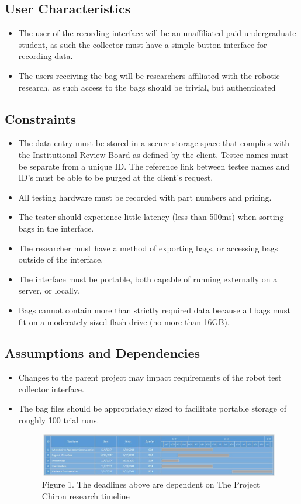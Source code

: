 \documentclass[onecolumn, draftclsnofoot,10pt, compsoc]{IEEEtran}
\begin{document}
\subsection{User Characteristics}
\begin{itemize}
	\item The user of the recording interface will be an unaffiliated paid undergraduate student, as such the collector must have a simple button interface for recording data.
	\item The users receiving the bag will be researchers affiliated with the robotic research, as such access to the bags should be trivial, but authenticated

\end{itemize}
\subsection{Constraints}
\begin{itemize}
	\item The data entry must be stored in a secure storage space that complies with the Institutional Review Board as defined by the client.
		\subitem Testee names must be separate from a unique ID.
		\subitem The reference link between testee names and ID's must be able to be purged at the client's request.
	\item All testing hardware must be recorded with part numbers and pricing.
	\item The tester should experience little latency (less than 500ms) when sorting bags in the interface.
	\item The researcher must have a method of exporting bags, or accessing bags outside of the interface.
	\item The interface must be portable, both capable of running externally on a server, or locally.
	\item Bags cannot contain more than strictly required data because all bags must fit on a moderately-sized flash drive (no more than 16GB).
\end{itemize}
\subsection{Assumptions and Dependencies}
\begin{itemize}
	\item Changes to the parent project may impact requirements of the robot test collector interface.
	\item The bag files should be appropriately sized to facilitate portable storage of roughly 100 trial runs.
	\begin{figure}[h!]
		
		\centering
		\includegraphics[width=\linewidth, scale=0.7]{PrelimGanttChart.jpg}
		Figure 1. The deadlines above are dependent on The Project Chiron research timeline
	\end{figure}
	
\end{itemize}
\end{document}
